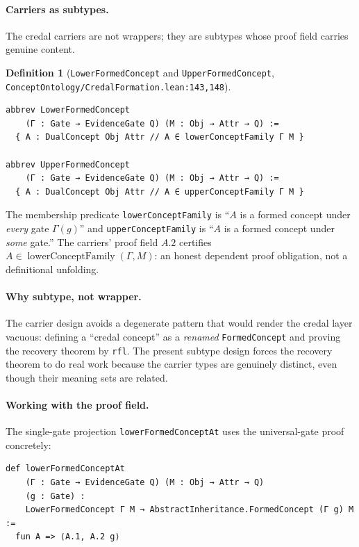 \documentclass[]{article}
\newtheorem{definition}[theorem]{Definition}
\newcommand{\lid}[1]{{\ttfamily\nolinkurl{#1}}}
\newcommand{\lpath}[1]{\texttt{\nolinkurl{#1}}}
\begin{document}
\paragraph{Carriers as subtypes.} The credal carriers are not wrappers; they are
subtypes whose proof field carries genuine content.

\begin{definition}[\lid{LowerFormedConcept} and \lid{UpperFormedConcept},
\lpath{ConceptOntology/CredalFormation.lean:143,148}]\label{def:carriers}
\begin{lstlisting}
abbrev LowerFormedConcept
    (Γ : Gate → EvidenceGate Q) (M : Obj → Attr → Q) :=
  { A : DualConcept Obj Attr // A ∈ lowerConceptFamily Γ M }

abbrev UpperFormedConcept
    (Γ : Gate → EvidenceGate Q) (M : Obj → Attr → Q) :=
  { A : DualConcept Obj Attr // A ∈ upperConceptFamily Γ M }
\end{lstlisting}
\end{definition}

\noindent The membership predicate \lid{lowerConceptFamily} is ``$A$ is a formed
concept under \emph{every} gate $\Gamma(g)$'' and \lid{upperConceptFamily} is ``$A$
is a formed concept under \emph{some} gate.'' The carriers' proof field \(A.2\)
certifies \(A \in \operatorname{lowerConceptFamily}(\Gamma,M)\): an honest
dependent proof obligation, not a definitional unfolding.

\paragraph{Why subtype, not wrapper.} The carrier design avoids a degenerate
pattern that would render the credal layer vacuous: defining a ``credal concept''
as a \emph{renamed} \lid{FormedConcept} and proving the recovery theorem by
\lid{rfl}. The present subtype design forces the recovery theorem to do real work
because the carrier types are genuinely distinct, even though their meaning sets are
related.

\paragraph{Working with the proof field.} The single-gate projection
\lid{lowerFormedConceptAt} uses the universal-gate proof concretely:

\begin{lstlisting}
def lowerFormedConceptAt
    (Γ : Gate → EvidenceGate Q) (M : Obj → Attr → Q)
    (g : Gate) :
    LowerFormedConcept Γ M → AbstractInheritance.FormedConcept (Γ g) M :=
  fun A => ⟨A.1, A.2 g⟩
\end{lstlisting}
\end{document}
